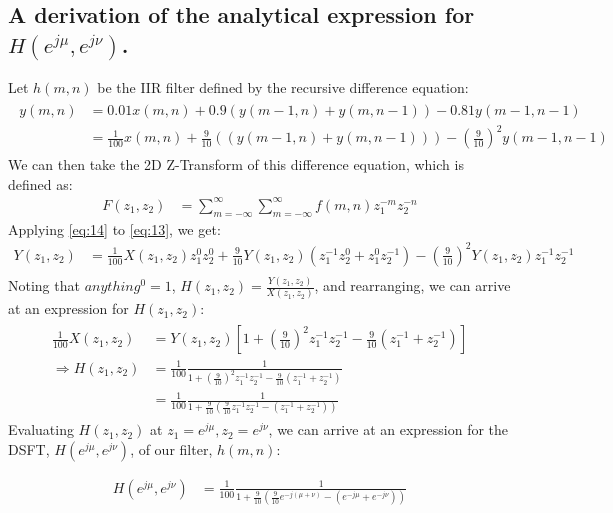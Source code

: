 \documentclass{article}
\begin{document}
\subsection{A derivation of the analytical expression for $H(e^{j \mu}, e^{j \nu})$.}
Let $h(m,n)$ be the IIR filter defined by the recursive difference equation:
\begin{align}\label{eq:13}
\begin{split}
    y(m,n) &= 0.01 x(m,n) + 0.9 (y(m-1,n) + y(m, n-1)) - 0.81 y(m-1,n-1)\\
    &= \frac{1}{100} x(m,n) + \frac{9}{10}((y(m-1,n) + y(m, n-1))) - (\frac{9}{10})^2 y(m-1,n-1)
\end{split}
\end{align}
We can then take the 2D Z-Transform of this difference equation, which is defined as:
\begin{align}
    F(z_1, z_2) &= \sum_{m=-\infty}^{\infty} \sum_{m=-\infty}^{\infty} f(m,n) z_1^{-m} z_2^{-n}
    \label{eq:14}
\end{align}
Applying \eqref{eq:14} to \eqref{eq:13}, we get:
\begin{align*}
    Y(z_1, z_2) &= \frac{1}{100} X(z_1,z_2) z_1^0 z_2^0 + \frac{9}{10} Y(z_1,z_2)(z_1^{-1} z_2^0 + z_1^0 z_2^{-1}) - (\frac{9}{10})^2 Y(z_1,z_2) z_1^{-1} z_2^{-1}\\
\end{align*}
Noting that $anything^0 = 1$, $H(z_1,z_2) = \frac{Y(z_1, z_2)}{X(z_1,z_2)}$, and rearranging, we can arrive at an expression for $H(z_1, z_2)$:
\begin{align}\label{eq:15}
\begin{split}
\frac{1}{100} X(z_1, z_2) &= Y(z_1,z_2)[1 + (\frac{9}{10})^2 z_1^{-1} z_2^{-1} - \frac{9}{10} (z_1^{-1} + z_2^{-1})]\\
\Rightarrow H(z_1, z_2) &= \frac{1}{100} \frac{1}{1 + (\frac{9}{10})^2 z_1^{-1} z_2^{-1} - \frac{9}{10} (z_1^{-1} + z_2^{-1})}\\
&= \frac{1}{100} \frac{1}{1 + \frac{9}{10} (\frac{9}{10} z_1^{-1} z_2^{-1}
 - (z_1^{-1} + z_2^{-1}))}
\end{split}
\end{align}
Evaluating $H(z_1,z_2)$ at $z_1 = e^{j \mu}, z_2 = e^{j \nu}$, we can arrive at an expression for the DSFT, $H(e^{j \mu},e^{j \nu})$, of our filter, $h(m,n)$:
\begin{tcolorbox}[colback=red!5!white,colframe=red!75!black]
\begin{align}\label{eq:16}
H(e^{j \mu},e^{j \nu}) &= \frac{1}{100} \frac{1}{1 + \frac{9}{10} (\frac{9}{10} e^{-j (\mu + \nu)} - (e^{-j \mu} + e^{-j \nu}))}
\end{align}
\end{tcolorbox}
\newpage
\end{document}

